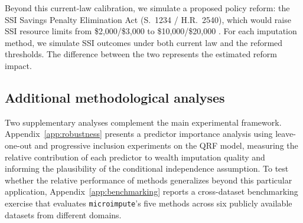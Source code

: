 Beyond this current-law calibration, we simulate a proposed policy reform: the SSI Savings Penalty Elimination Act (S.~1234 / H.R.~2540), which would raise SSI resource limits from \$2,000/\$3,000 to \$10,000/\$20,000 \citep{ssi_spea_2025}. For each imputation method, we simulate SSI outcomes under both current law and the reformed thresholds. The difference between the two represents the estimated reform impact.

\subsection{Additional methodological analyses}

Two supplementary analyses complement the main experimental framework. Appendix~\ref{app:robustness} presents a predictor importance analysis using leave-one-out and progressive inclusion experiments on the QRF model, measuring the relative contribution of each predictor to wealth imputation quality and informing the plausibility of the conditional independence assumption. To test whether the relative performance of methods generalizes beyond this particular application, Appendix~\ref{app:benchmarking} reports a cross-dataset benchmarking exercise that evaluates \texttt{microimpute}'s five methods across six publicly available datasets from different domains.
